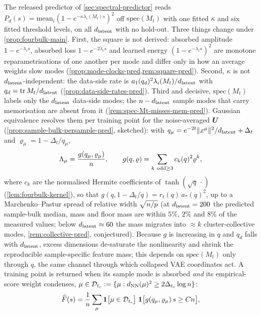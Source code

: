 The released predictor of \cref{sec:spectral-predictor} reads $P_d(s)=\mathrm{mean}_i(1-e^{-\kappa\lambda_i(M_t)s})^2$ off $\mathrm{spec}(M_t)$ with one fitted $\kappa$ and six fitted threshold levels, on all $d_{\mathrm{latent}}$ with no hold-out. Three things change under \cref{prop:fourbulk-main}. First, the square is not derived: absorbed amplitude $1-e^{-\lambda_is}$, absorbed loss $1-e^{-2\lambda_is}$ and learned energy $(1-e^{-\lambda_is})^2$ are monotone reparametrisations of one another per mode and differ only in how an average weights slow modes (\cref{prop:mode-clocks-pred,rem:square-pred}). Second, $\kappa$ is not $d_{\mathrm{latent}}$-independent: the data-side rate is $a_1(q_d)^2\lambda_i(M_t)/d_{\mathrm{latent}}$ with $q_d=\operatorname{tr}M_t/d_{\mathrm{latent}}$ (\cref{prop:data-side-rates-pred}). Third and decisive, $\mathrm{spec}(M_t)$ labels only the $d_{\mathrm{latent}}$ data-side modes; the $n-d_{\mathrm{latent}}$ sample modes that carry memorisation are absent from it (\cref{rem:spec-Mt-misses-mem-pred}). Gaussian equivalence resolves them per training point for the noise-averaged $\bm{U}$ (\cref{prop:sample-bulk-persample-pred}, sketched): with $q_\mu=e^{-2t}\|x^\mu\|^2/d_{\mathrm{latent}}+\Delta_t$ and $\varrho_\mu=1-\Delta_t/q_\mu$,
\begin{equation}\label{eq:Lambda-mu-pred-main}
\Lambda_\mu=\frac{g(q_\mu,\varrho_\mu)}{n},\qquad g(q,\varrho)=\sum_{k\ \mathrm{odd}\ge3}c_k(q)^2\varrho^k ,
\end{equation}
where $c_k$ are the normalised Hermite coefficients of $\tanh(\sqrt q\,\cdot)$ (\cref{lem:fourbulk-kernel}), so that $g(q,1-\Delta_t/q)=r_t(q)\,a_*(q)^2$, up to a Marchenko--Pastur spread of relative width $\sqrt{n/p}$ (at $d_{\mathrm{latent}}=200$ the predicted sample-bulk median, mass and floor mass are within $5\%$, $2\%$ and $8\%$ of the measured values; below $d_{\mathrm{latent}}\approx60$ the mass migrates into $\approx k$ cluster-collective modes, \cref{rem:collective-pred}, conjectured). Because $g$ is increasing in $q$ and $q_d$ falls with $d_{\mathrm{latent}}$, excess dimensions de-saturate the nonlinearity and shrink the reproducible sample-specific feature mass; this depends on $\mathrm{spec}(M_t)$ only through $q$, the same channel through which collapsed VAE coordinates act. A training point is returned when its sample mode is absorbed \emph{and} its empirical-score weight condenses, $\mu\in\mathcal D_{t_c}:=\{\mu:d_{\rm NN}(\mu)^2\ge2\Delta_{t_c}\log n\}$:
\begin{equation}\label{eq:two-source-pred}
\widehat F(s)=\frac1{n}\sum_{\mu}\mathbf 1\bigl[\mu\in\mathcal D_{t_c}\bigr]\;\mathbf 1\bigl[g(q_\mu,\varrho_\mu)\,s\ge Cn\bigr],
\end{equation}
